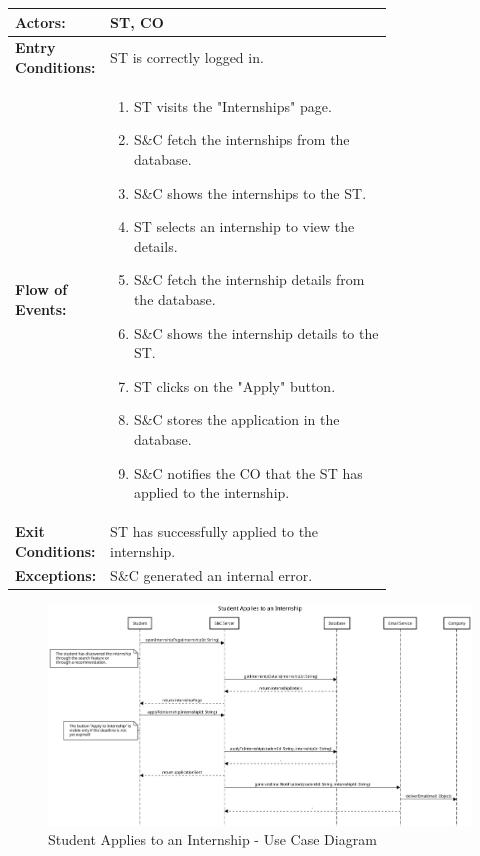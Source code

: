 \begin{center}
    \begin{longtable}{|l|p{0.75\linewidth}|}
        \hline
        \textbf{Actors:}           & ST, CO                                                               \\
        \hline
        \textbf{Entry Conditions:} & ST is correctly logged in.                                           \\
        \hline
        \textbf{Flow of Events:}   & \begin{enumerate}
                                         \item ST visits the "Internships" page.
                                         \item S\&C fetch the internships from the database.
                                         \item S\&C shows the internships to the ST.
                                         \item ST selects an internship to view the details.
                                         \item S\&C fetch the internship details from the database.
                                         \item S\&C shows the internship details to the ST.
                                         \item ST clicks on the "Apply" button.
                                         \item S\&C stores the application in the database.
                                         \item S\&C notifies the CO that the ST has applied to the internship.
                                     \end{enumerate} \\
        \hline
        \textbf{Exit Conditions:}  & ST has successfully applied to the internship.                       \\
        \hline
        \textbf{Exceptions:}       & S\&C generated an internal error.                                    \\
        \hline
    \end{longtable}
\end{center}

\begin{figure}[H]
    \centering
    \includegraphics[width=1.0\textwidth]{Images/UC_4.pdf}
    \caption{Student Applies to an Internship - Use Case Diagram}
    \label{fig:use-case-diagram-4}
\end{figure}

